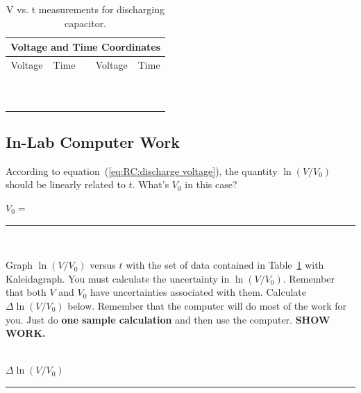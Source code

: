 \begin{table}[htb]
\begin{center}
\begin{tabular}{|c|c|c|c|c|}
\hline
\multicolumn{5}{|c|}{Voltage and Time Coordinates} \\
\hline
Voltage & Time & & Voltage & Time \\
\hline
\hspace*{3cm} & \hspace*{3cm} & \hspace*{.1cm} & \hspace*{3cm} & \hspace*{3cm} \\
& & & & \\
\hline
& & & & \\
& & & & \\
\hline
& & & & \\
& & & & \\
\hline
& & & & \\
& & & & \\
\hline
& & & & \\
& & & & \\
\hline

\end{tabular}
\end{center}
\caption{V vs. t measurements for discharging capacitor.}
\label{tab:RC:decay}
\end{table}


\subsection{In-Lab Computer Work}
According to 
equation~(\ref{eq:RC:discharge voltage}), the quantity $\ln (V/V_0)$ should be 
linearly related to $t$. What's $V_0$ in this case? \\
\begin{center}
$V_0 = $ ~ \rule{3cm}{.1mm} \\
\end{center} 
Graph $\ln (V/V_0)$ versus 
$t$ with the set of data contained in Table~\ref{tab:RC:decay} with 
Kaleidagraph.  You must calculate the uncertainty in $\ln (V/V_0)$.  Remember
that both $V$ and $V_0$ have uncertainties associated with them.
Calculate $\Delta\ln (V/V_0)$ below.
Remember that the computer will do most of the work for you.  Just do {\bf one
sample calculation} and then use the computer.  {\bf SHOW WORK.} \\
\vspace*{2.3cm} \\
\begin{center}
$\Delta\ln (V/V_0)$  ~ \rule{3cm}{.1mm} \\
\end{center}


